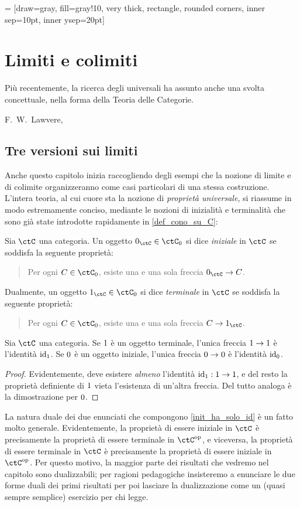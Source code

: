  = [draw=gray, fill=gray!10, very thick,
rectangle, rounded corners, inner sep=10pt, inner ysep=20pt]
\chapter{Limiti e colimiti}\label{chap_limiti_colimiti}
\epigraph{Più recentemente, la ricerca degli universali ha assunto anche una svolta concettuale, nella forma della Teoria delle Categorie.}{F.\ W.\ Lawvere, \cite{lawvere1969adjointness}}
\section{Tre versioni sui limiti}
Anche questo capitolo inizia raccogliendo degli esempi che la nozione di limite e di colimite organizzeranno come casi particolari di una stessa costruzione. L'intera teoria, al cui cuore sta la nozione di \emph{proprietà universale}, si riassume in modo estremamente conciso, mediante le nozioni di inizialità e terminalità che sono già state introdotte rapidamente in \ref{def_cono_su_C}:
\begin{definition}
	Sia \(\ctC\) una categoria. Un oggetto \(\init_\ctC\in\ctC_0\) si dice \emph{iniziale} in \(\ctC\) se soddisfa la seguente proprietà:
	\begin{quote}
		Per ogni \(C\in\ctC_0\), esiste una e una sola freccia \(\init_\ctC \to C\).
	\end{quote}
	Dualmente, un oggetto \(\term_\ctC\in\ctC_0\) si dice \emph{terminale} in \(\ctC\) se soddisfa la seguente proprietà:
	\begin{quote}
		Per ogni \(C\in\ctC_0\), esiste una e una sola freccia \(C\to\term_\ctC\).
	\end{quote}
\end{definition}
\begin{lemma}\label{init_ha_solo_id}
	Sia $\ctC$ una categoria. Se $1$ è un oggetto terminale, l'unica freccia $1\to1$ è l'identità $\mathrm{id}_1$. Se $0$ è un oggetto iniziale, l'unica freccia $0\to0$ è l'identità $\mathrm{id}_0$.
\end{lemma}
\begin{proof}
	Evidentemente, deve esistere \emph{almeno} l'identità $\mathrm{id}_1 : 1\to1$, e del resto la proprietà definiente di $1$ vieta l'esistenza di un'altra freccia. Del tutto analoga è la dimostrazione per $0$.
\end{proof}
La natura duale dei due enunciati che compongono \ref{init_ha_solo_id} è un fatto molto generale. Evidentemente, la proprietà di essere iniziale in \(\ctC\) è precisamente la proprietà di essere terminale in \(\ctC^\op\), e viceversa, la proprietà di essere terminale in \(\ctC\) è precisamente la proprietà di essere iniziale in \(\ctC^\op\). Per questo motivo, la maggior parte dei risultati che vedremo nel capitolo sono dualizzabili; per ragioni pedagogiche insisteremo a enunciare le due forme duali dei primi risultati per poi lasciare la dualizzazione come un (quasi sempre semplice) esercizio per chi legge.
